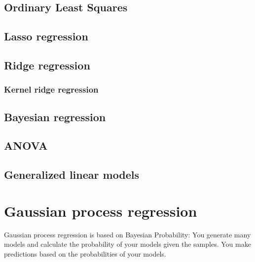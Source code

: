 \documentclass[
]{book}
\begin{document}
\hypertarget{ordinary-least-squares}{%
\subsection{Ordinary Least Squares}\label{ordinary-least-squares}}

\hypertarget{lasso-regression}{%
\subsection{Lasso regression}\label{lasso-regression}}

\hypertarget{ridge-regression}{%
\subsection{Ridge regression}\label{ridge-regression}}

\hypertarget{kernel-ridge-regression}{%
\subsubsection{Kernel ridge regression}\label{kernel-ridge-regression}}

\hypertarget{bayesian-regression}{%
\subsection{Bayesian regression}\label{bayesian-regression}}

\hypertarget{anova}{%
\subsection{ANOVA}\label{anova}}

\hypertarget{generalized-linear-models}{%
\subsection{Generalized linear models}\label{generalized-linear-models}}

\hypertarget{gaussian-process-regression}{%
\section{Gaussian process regression}\label{gaussian-process-regression}}

Gaussian process regression is based on Bayesian Probability: You
generate many models and calculate the probability of your models given
the samples. You make predictions based on the probabilities of your
models.
\end{document}
